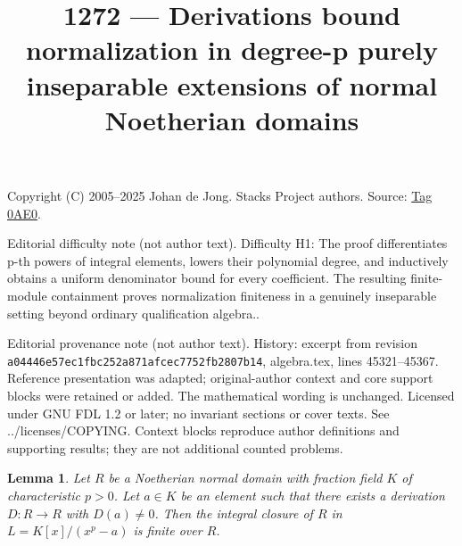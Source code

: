 \documentclass{amsart}
\theoremstyle{plain}
\newtheorem{lemma}[subsection]{Lemma}
\theoremstyle{definition}
\theoremstyle{remark}
\numberwithin{equation}{subsection}
\begin{document}
\title[Stacks Project, Tag 0AE0]{1272 --- Derivations bound normalization in degree-p purely inseparable extensions of normal Noetherian domains}
\maketitle
\noindent Copyright (C) 2005--2025 Johan de Jong. Stacks Project authors. Source: \href{https://stacks.math.columbia.edu/tag/0AE0}{Tag 0AE0}.

\noindent Editorial difficulty note (not author text). Difficulty H1: The proof differentiates p-th powers of integral elements, lowers their polynomial degree, and inductively obtains a uniform denominator bound for every coefficient. The resulting finite-module containment proves normalization finiteness in a genuinely inseparable setting beyond ordinary qualification algebra..

\noindent Editorial provenance note (not author text). History: excerpt from revision \texttt{a0444\allowbreak 6e57e\allowbreak c1fbc\allowbreak 252a8\allowbreak 71afc\allowbreak ec775\allowbreak 2fb28\allowbreak 07b14}, algebra.tex, lines 45321--45367. Reference presentation was adapted; original-author context and core support blocks were retained or added. The mathematical wording is unchanged. Licensed under GNU FDL 1.2 or later; no invariant sections or cover texts. See ../licenses/COPYING. Context blocks reproduce author definitions and supporting results; they are not additional counted problems.

\begin{lemma}
\label{lemma-Noetherian-normal-domain-insep-extension}
Let $R$ be a Noetherian normal domain with fraction field $K$
of characteristic $p > 0$.
Let $a \in K$ be an element such that there exists a derivation
$D : R \to R$ with $D(a) \not = 0$. Then the integral closure
of $R$ in $L = K[x]/(x^p - a)$ is finite over $R$.
\end{lemma}
\end{document}
